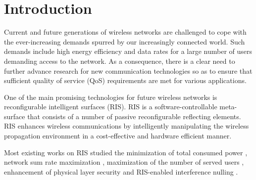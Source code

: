 \documentclass[10pt,conference]{IEEEtran}
\begin{document}
\section{Introduction} \label{sec:Introduction}
Current and  future generations of wireless networks are challenged to cope with the ever-increasing demands spurred by our increasingly connected world.
Such demands include high energy efficiency and data rates for a large number of users demanding access to the network\cite{yang2021energy}. 
As a consequence, there is a clear need to further advance research for new communication technologies so as to ensure that sufficient quality of service (QoS) requirements are met for various applications.

One of the main promising technologies for future wireless networks is reconfigurable intelligent surfaces (RIS). RIS is a  software-controllable meta-surface that consists of a number of passive reconfigurable reflecting elements\cite{renzo2019smart}. RIS enhances wireless communications by intelligently manipulating
the wireless propagation environment in a cost-effective and hardware
efficient manner. 

Most existing works on RIS studied the minimization of total consumed power \cite{wu2019beamforming}, network sum rate maximization \cite{huang2018achievable}, maximization of the number of served users \cite{zivuku2022maximizing}, enhancement of physical layer security \cite{makin2022enhancing} and RIS-enabled interference nulling \cite{jiang2022interference}.
\end{document}
